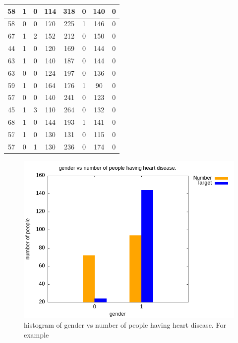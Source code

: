 \documentclass{article}
\begin{document}
\begin{longtable}{|c|c|c|c|c|c|c|c|}
\hline
58 & 1 & 0 & 114 & 318 & 0 & 140 & 0 \\
\hline
58 & 0 & 0 & 170 & 225 & 1 & 146 & 0 \\
\hline
67 & 1 & 2 & 152 & 212 & 0 & 150 & 0 \\
\hline
44 & 1 & 0 & 120 & 169 & 0 & 144 & 0 \\
\hline
63 & 1 & 0 & 140 & 187 & 0 & 144 & 0 \\
\hline
63 & 0 & 0 & 124 & 197 & 0 & 136 & 0 \\
\hline
59 & 1 & 0 & 164 & 176 & 1 & 90 & 0 \\
\hline
57 & 0 & 0 & 140 & 241 & 0 & 123 & 0 \\
\hline
45 & 1 & 3 & 110 & 264 & 0 & 132 & 0 \\
\hline
68 & 1 & 0 & 144 & 193 & 1 & 141 & 0 \\
\hline
57 & 1 & 0 & 130 & 131 & 0 & 115 & 0 \\
\hline
57 & 0 & 1 & 130 & 236 & 0 & 174 & 0 \\
\hline
\end{longtable}
\begin{figure}[H]
	\centering
	\includegraphics{question4_a.png}
	\caption{histogram of gender vs number of people having heart disease.
		For example}
	\label{figure1}
\end{figure}
\end{document}
